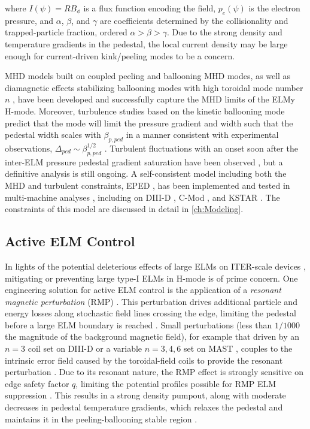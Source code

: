 \noindent where $I(\psi) = RB_\phi$ is a flux function encoding the field, $p_e(\psi)$ is the electron pressure, and $\alpha$, $\beta$, and $\gamma$ are coefficients determined by the collisionality and trapped-particle fraction, ordered $\alpha > \beta > \gamma$.  Due to the strong density and temperature gradients in the pedestal, the local current density may be large enough for current-driven kink/peeling modes to be a concern.  

MHD models built on coupled peeling and ballooning MHD modes, as well as diamagnetic effects stabilizing ballooning modes with high toroidal mode number $n$ \cite{Suttrop2000}, have been developed \cite{Snyder2002,Turnbull2003} and successfully capture the MHD limits of the ELMy H-mode.  Moreover, turbulence studies based on the kinetic ballooning mode \cite{Tang1980} predict that the mode will limit the pressure gradient and width such that the pedestal width scales with $\beta_{p,ped}$ in a manner consistent with experimental observations, $\Delta_{ped} \sim \beta_{p,ped}^{1/2}$ \cite{Snyder2001}.  Turbulent fluctuations with an onset soon after the inter-ELM pressure pedestal gradient saturation have been observed \cite{Diallo2014}, but a definitive analysis is still ongoing.  A self-consistent model including both the MHD and turbulent constraints, EPED \cite{Snyder2009}, has been implemented and tested in multi-machine analyses \cite{Groebner2013}, including on DIII-D \cite{Snyder2012}, C-Mod \cite{Walk2012}, and KSTAR \cite{Han2013}.  The constraints of this model are discussed in detail in \cref{ch:Modeling}.

\subsection{Active ELM Control}\label{subsec:hcr_elmy_control}

In lights of the potential deleterious effects of large ELMs on ITER-scale devices \cite{Loarte2003,Federici2003}, mitigating or preventing large type-I ELMs in H-mode is of prime concern.  One engineering solution for active ELM control is the application of a \emph{resonant magnetic perturbation} (RMP) \cite{Evans2004,Moyer2005,Evans2006}.  This perturbation drives additional particle and energy losses along stochastic field lines crossing the edge, limiting the pedestal before a large ELM boundary is reached \cite{Evans2004,Moyer2005}.  Small perturbations (less than $1/1000$ the magnitude of the background magnetic field), for example that driven by an $n=3$ coil set on DIII-D \cite{Evans2004} or a variable $n=3,4,6$ set on MAST \cite{Kirk2013}, couples to the intrinsic error field caused by the toroidal-field coils to provide the resonant perturbation \cite{Moyer2005}.  Due to its resonant nature, the RMP effect is strongly sensitive on edge safety factor $q$, limiting the potential profiles possible for RMP ELM suppression \cite{Moyer2005}.  This results in a strong density pumpout, along with moderate decreases in pedestal temperature gradients, which relaxes the pedestal and maintains it in the peeling-ballooning stable region \cite{Evans2006,Snyder2012}.

